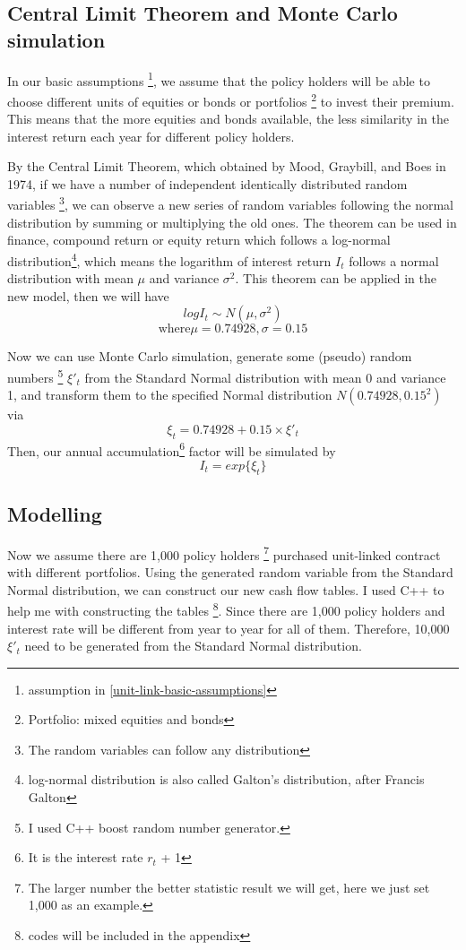 \documentclass{report}
\begin{document}
\subsection{Central Limit Theorem and Monte Carlo simulation}

In our basic assumptions \footnote{assumption in \ref{unit-link-basic-assumptions}}, we assume that the policy holders will be able to choose different units of equities or bonds or portfolios \footnote{Portfolio: mixed equities and bonds} to invest their premium. This means that the more equities and bonds available, the less similarity in the interest return each year for different policy holders. 

By \cite{bib:CLT}the Central Limit Theorem, which obtained by Mood, Graybill, and Boes in 1974, if we have a number of independent identically distributed random variables \footnote{The random variables can follow any distribution}, we can observe a new series of random variables following the normal distribution by summing or multiplying the old ones. The theorem can be used in finance, compound return or equity return which follows a log-normal distribution\footnote{log-normal distribution is also called Galton's distribution, after Francis Galton}, which means the logarithm of interest return $I_t$ follows a normal distribution with mean $\mu$ and variance $\sigma^2$. This theorem can be applied in the new model, then we will have
\[
logI_t  \sim N(\mu,\sigma^2)
\]
\[
\text{where}   \mu= 0.74928, \sigma= 0.15 
\]

Now we can use Monte Carlo simulation\cite{bib:MCS}, generate some (pseudo) random numbers \footnote{I used C++ boost random number generator.} $\xi'_t$ from the Standard Normal distribution with mean 0 and variance 1, and transform them to the specified Normal distribution $N(0.74928,0.15^2)$ via   
\[
\xi_t = 0.74928 + 0.15\times \xi'_t
\]
Then, our annual accumulation\footnote{It is the interest rate $r_t$ + 1} factor will be simulated by 
\[
I_t=exp\{\xi_t\} 
\]



\subsection{Modelling}

Now we assume there are 1,000 policy holders \footnote{The larger number the better statistic result we will get, here we just set 1,000 as an example.} purchased unit-linked contract with different portfolios. Using the generated random variable from the Standard Normal distribution, we can construct our new cash flow tables. I used C++ to help me with constructing the tables \footnote{codes will be included in the appendix}. Since there are 1,000 policy holders and interest rate will be different from year to year for all of them. Therefore, 10,000  $\xi'_t$ need to be generated from the Standard Normal distribution.
\end{document}
